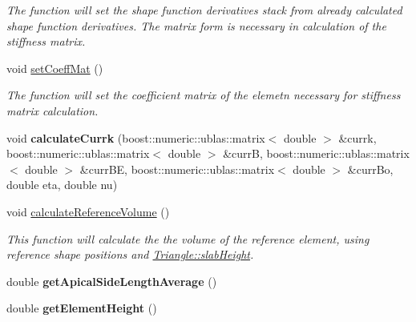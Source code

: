 \begin{DoxyCompactItemize}
\begin{DoxyCompactList}\small\item\em The function will set the shape function derivatives stack from already calculated shape function derivatives. The matrix form is necessary in calculation of the stiffness matrix. \end{DoxyCompactList}\item 
\hypertarget{classTriangle_a43d8581fe626bc89e68b3f0572106211}{}void \hyperlink{classTriangle_a43d8581fe626bc89e68b3f0572106211}{set\+Coeff\+Mat} ()\label{classTriangle_a43d8581fe626bc89e68b3f0572106211}

\begin{DoxyCompactList}\small\item\em The function will set the coefficient matrix of the elemetn necessary for stiffness matrix calculation. \end{DoxyCompactList}\item 
\hypertarget{classTriangle_a1dc3a679e4b5ef53a94923788afd26e5}{}void {\bfseries calculate\+Currk} (boost\+::numeric\+::ublas\+::matrix$<$ double $>$ \&currk, boost\+::numeric\+::ublas\+::matrix$<$ double $>$ \&curr\+B, boost\+::numeric\+::ublas\+::matrix$<$ double $>$ \&curr\+B\+E, boost\+::numeric\+::ublas\+::matrix$<$ double $>$ \&curr\+Bo, double eta, double nu)\label{classTriangle_a1dc3a679e4b5ef53a94923788afd26e5}

\item 
\hypertarget{classTriangle_aa3372ccff16fb2bbbbafb90e6e839607}{}void \hyperlink{classTriangle_aa3372ccff16fb2bbbbafb90e6e839607}{calculate\+Reference\+Volume} ()\label{classTriangle_aa3372ccff16fb2bbbbafb90e6e839607}

\begin{DoxyCompactList}\small\item\em This function will calculate the the volume of the reference element, using reference shape positions and \hyperlink{classTriangle_a78b065ab25dff7133101ec341638532d}{Triangle\+::slab\+Height}. \end{DoxyCompactList}\item 
\hypertarget{classTriangle_a997f0b9a849540006795db90b753eaa2}{}double {\bfseries get\+Apical\+Side\+Length\+Average} ()\label{classTriangle_a997f0b9a849540006795db90b753eaa2}

\item 
\hypertarget{classTriangle_a4c91b5e09d569d000f5c6247662497f1}{}double {\bfseries get\+Element\+Height} ()\label{classTriangle_a4c91b5e09d569d000f5c6247662497f1}

\end{DoxyCompactItemize}
